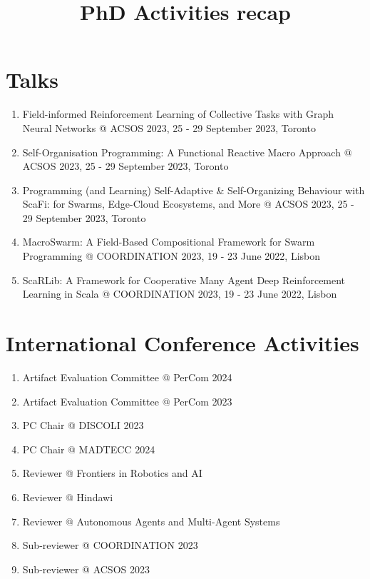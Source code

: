\documentclass[11pt]{article}
\begin{document}
\title{PhD Activities recap}
\maketitle
\section{Talks}
\begin{enumerate}
	\item Field-informed Reinforcement Learning of Collective Tasks with Graph Neural Networks @ ACSOS 2023, 25 - 29 September 2023, Toronto
	\item Self-Organisation Programming: A Functional Reactive Macro Approach @ ACSOS 2023, 25 - 29 September 2023, Toronto
	\item Programming (and Learning) Self-Adaptive \& Self-Organizing Behaviour with ScaFi: for Swarms, Edge-Cloud Ecosystems, and More @ ACSOS 2023, 25 - 29 September 2023, Toronto
	\item MacroSwarm: A Field-Based Compositional Framework for Swarm Programming @ COORDINATION 2023, 19 - 23 June 2022, Lisbon
	\item ScaRLib: A Framework for Cooperative Many Agent Deep Reinforcement Learning in Scala @ COORDINATION 2023, 19 - 23 June 2022, Lisbon
\end{enumerate}
\section{International Conference Activities}
\begin{enumerate}
	\item Artifact Evaluation Committee @ PerCom 2024
	\item Artifact Evaluation Committee @ PerCom 2023
	\item PC Chair @ DISCOLI 2023
	\item PC Chair @ MADTECC 2024
	\item Reviewer @ Frontiers in Robotics and AI
	\item Reviewer @ Hindawi
	\item Reviewer @ Autonomous Agents and Multi-Agent Systems 
	\item Sub-reviewer @ COORDINATION 2023
	\item Sub-reviewer @ ACSOS 2023
\end{enumerate}
\end{document}

